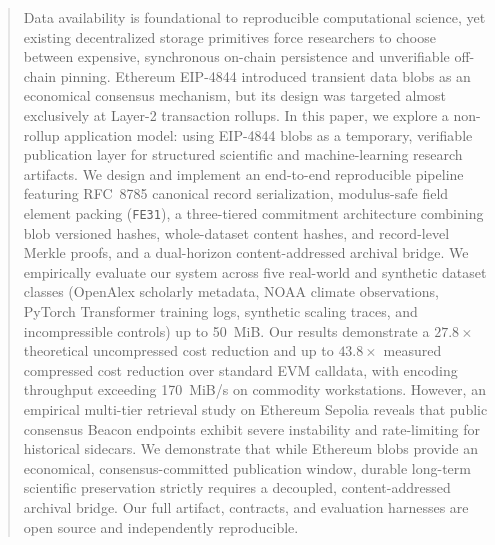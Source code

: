 \begin{abstract}
Data availability is foundational to reproducible computational science, yet existing decentralized storage primitives force researchers to choose between expensive, synchronous on-chain persistence and unverifiable off-chain pinning. Ethereum EIP-4844 introduced transient data blobs as an economical consensus mechanism, but its design was targeted almost exclusively at Layer-2 transaction rollups. In this paper, we explore a non-rollup application model: using EIP-4844 blobs as a temporary, verifiable publication layer for structured scientific and machine-learning research artifacts. We design and implement an end-to-end reproducible pipeline featuring RFC~8785 canonical record serialization, modulus-safe field element packing (\texttt{FE31}), a three-tiered commitment architecture combining blob versioned hashes, whole-dataset content hashes, and record-level Merkle proofs, and a dual-horizon content-addressed archival bridge. We empirically evaluate our system across five real-world and synthetic dataset classes (OpenAlex scholarly metadata, NOAA climate observations, PyTorch Transformer training logs, synthetic scaling traces, and incompressible controls) up to 50~MiB. Our results demonstrate a $27.8\times$ theoretical uncompressed cost reduction and up to $43.8\times$ measured compressed cost reduction over standard EVM calldata, with encoding throughput exceeding 170~MiB/s on commodity workstations. However, an empirical multi-tier retrieval study on Ethereum Sepolia reveals that public consensus Beacon endpoints exhibit severe instability and rate-limiting for historical sidecars. We demonstrate that while Ethereum blobs provide an economical, consensus-committed publication window, durable long-term scientific preservation strictly requires a decoupled, content-addressed archival bridge. Our full artifact, contracts, and evaluation harnesses are open source and independently reproducible.
\end{abstract}
